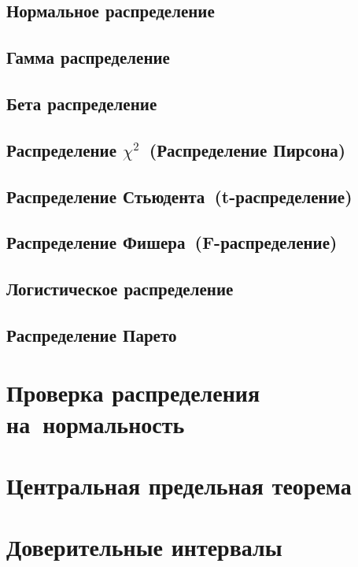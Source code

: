\documentclass[]{scrartcl}
\begin{document}
\subsection{Нормальное распределение}

\subsection{Гамма распределение}

\subsection{Бета распределение}

\subsection{Распределение $\chi^{2}$~(Распределение Пирсона)}

\subsection{Распределение Стьюдента~(t-распределение)}

\subsection{Распределение Фишера~(F-распределение)}
 
\subsection{Логистическое распределение}

\subsection{Распределение Парето}

\section{Проверка распределения на~нормальность}

\section{Центральная предельная теорема}

\section{Доверительные интервалы}
\end{document}
